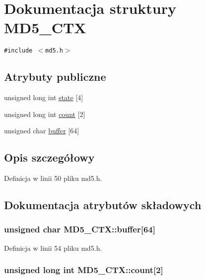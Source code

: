 \hypertarget{a00003}{
\section{Dokumentacja struktury MD5\_\-CTX}
\label{d1/d7c/a00003}
}
{\tt \#include $<$md5.h$>$}

\subsection*{Atrybuty publiczne}
\begin{CompactItemize}
\item 
unsigned long int \hyperlink{a00003_2f697997f51de65d08227fdf1d5c44b8}{state} \mbox{[}4\mbox{]}
\item 
unsigned long int \hyperlink{a00003_889cb6e121b82a1e7f4d92120fb8a523}{count} \mbox{[}2\mbox{]}
\item 
unsigned char \hyperlink{a00003_2da73ecf544745f58211e998719f367f}{buffer} \mbox{[}64\mbox{]}
\end{CompactItemize}


\subsection{Opis szczegółowy}


Definicja w linii 50 pliku md5.h.

\subsection{Dokumentacja atrybutów składowych}
\hypertarget{a00003_2da73ecf544745f58211e998719f367f}{
\subsubsection[{buffer}]{\setlength{\rightskip}{0pt plus 5cm}unsigned char {\bf MD5\_\-CTX::buffer}\mbox{[}64\mbox{]}}}
\label{d1/d7c/a00003_2da73ecf544745f58211e998719f367f}




Definicja w linii 54 pliku md5.h.\hypertarget{a00003_889cb6e121b82a1e7f4d92120fb8a523}{
\subsubsection[{count}]{\setlength{\rightskip}{0pt plus 5cm}unsigned long int {\bf MD5\_\-CTX::count}\mbox{[}2\mbox{]}}}
\label{d1/d7c/a00003_889cb6e121b82a1e7f4d92120fb8a523}




